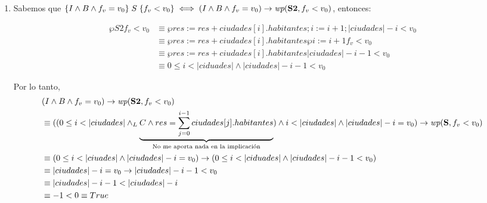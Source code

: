 \documentclass[10pt,a4paper]{article}
\begin{document}
\begin{enumerate}
	\item {}

	      Sabemos que $\hoare{I \land B \land f_v = v_0}{S}{f_v < v_0} \iff (I \land B \land f_v = v_0) \Then \wp{S2}{f_v < v_0}$, entonces:

	      \begin{align*}
		      \wp{S2}{f_v < v_0} & \equiv \wp{res := res + ciudades[i].habitantes; i := i + 1;}{|ciudades| - i < v_0} \\
		                         & \equiv \wp{res := res + ciudades[i].habitantes}{\wp{i := i + 1}{f_v < v_0}}        \\
		                         & \equiv \wp{res := res + ciudades[i].habitantes}{|ciudades| - i - 1 < v_0}          \\
		                         & \equiv 0 \leq i < |ciduades| \land |ciudades| - i - 1 < v_0
	      \end{align*}

	      Por lo tanto,
	      \begin{align*}
		       & (I \land B \land f_v = v_0) \Then \wp{S2}{f_v < v_0}                                                                                                                                                                                 \\
		       & \equiv ((0 \leq i < |ciudades| \yLuego \underbrace{C \land res = \sum_{j = 0}^{i - 1} ciudades[j].habitantes}_{\text{No me aporta nada en la implicación}}) \land i < |ciudades| \land |ciudades| - i = v_0) \Then \wp{S}{f_v < v_0} \\
		       & \equiv (0 \leq i < |ciuades| \land |ciudades| - i = v_0) \Then (0 \leq i < |ciduades| \land |ciudades| - i - 1 < v_0)                                                                                                                \\
		       & \equiv |ciudades| - i = v_0 \Then |ciudades| - i - 1 < v_0                                                                                                                                                                           \\
		       & \equiv |ciudades| - i - 1 < |ciudades| - i                                                                                                                                                                                           \\
		       & \equiv -1 < 0 \equiv True
	      \end{align*}


\end{enumerate}
\end{document}

